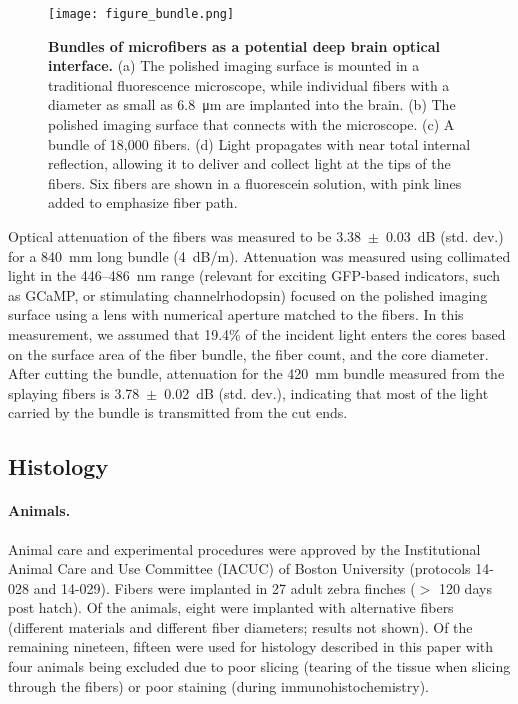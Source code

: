 \begin{figure}
\texttt{[image: figure\_bundle.png]}
\caption[Diagram of bundle of microfibers as an 
optical interface.]{\textbf{Bundles of microfibers as a potential deep brain 
optical interface.} (a) The polished imaging surface is 
mounted in a traditional fluorescence microscope, while 
individual fibers with a diameter as small as 
6.8~\si{\micro\meter} are implanted into the brain. (b) The polished 
imaging surface that connects with the microscope. 
(c) A bundle of 18,000 fibers. (d) Light propagates with 
near total internal reflection, allowing it to deliver 
and collect light at the tips of the fibers. Six fibers are shown in a 
fluorescein solution, with pink lines added to emphasize 
fiber path.}
\label{fig:bundle}
\end{figure}

Optical attenuation of the fibers was measured to be 3.38~$\pm$~0.03~dB (std. dev.) 
for a 840~mm long bundle (4~dB/m). Attenuation was measured using collimated light in the 
446--486~nm range (relevant for exciting GFP-based indicators, such as GCaMP, or 
stimulating channelrhodopsin) focused on the polished imaging surface using a lens 
with numerical aperture matched to the fibers. In this measurement, we assumed that
19.4\% of the incident light enters the cores based on the surface area of the fiber 
bundle, the fiber count, and the core diameter. 
After cutting the bundle, attenuation for the 420~mm bundle measured 
from the splaying fibers is 3.78~$\pm$~0.02~dB (std. dev.), indicating that most of 
the light carried by the bundle is transmitted from the cut ends.

\subsection{Histology}

\paragraph{Animals.} Animal care and experimental procedures were 
approved by the Institutional Animal Care and Use Committee (IACUC) 
of Boston University (protocols 14-028 and 14-029). Fibers were 
implanted in 27 adult zebra finches ($>$ 120 days post hatch). Of 
the animals, eight were implanted with alternative fibers 
(different materials and different fiber diameters; results not 
shown). Of the remaining nineteen, fifteen were used for histology 
described in this paper with four animals being excluded due to 
poor slicing (tearing of the tissue when slicing through the 
fibers) or poor staining (during immunohistochemistry).

